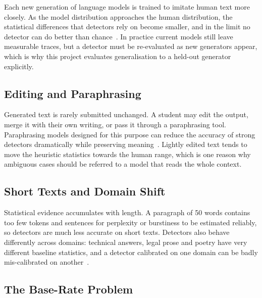 Each new generation of language models is trained to imitate human text more
closely. As the model distribution approaches the human distribution, the
statistical differences that detectors rely on become smaller, and in the limit
no detector can do better than chance~\cite{sadasivan2023reliably}. In practice
current models still leave measurable traces, but a detector must be
re-evaluated as new generators appear, which is why this project evaluates
generalisation to a held-out generator explicitly.

\subsection{Editing and Paraphrasing}

Generated text is rarely submitted unchanged. A student may edit the output,
merge it with their own writing, or pass it through a paraphrasing tool.
Paraphrasing models designed for this purpose can reduce the accuracy of
strong detectors dramatically while preserving meaning~\cite{krishna2023paraphrasing}.
Lightly edited text tends to move the heuristic statistics towards the human
range, which is one reason why ambiguous cases should be referred to a model
that reads the whole context.

\subsection{Short Texts and Domain Shift}

Statistical evidence accumulates with length. A paragraph of 50 words contains
too few tokens and sentences for perplexity or burstiness to be estimated
reliably, so detectors are much less accurate on short texts. Detectors also
behave differently across domains: technical answers, legal prose and poetry
have very different baseline statistics, and a detector calibrated on one
domain can be badly mis-calibrated on another~\cite{wang2024m4,li2024mage}.

\subsection{The Base-Rate Problem}

